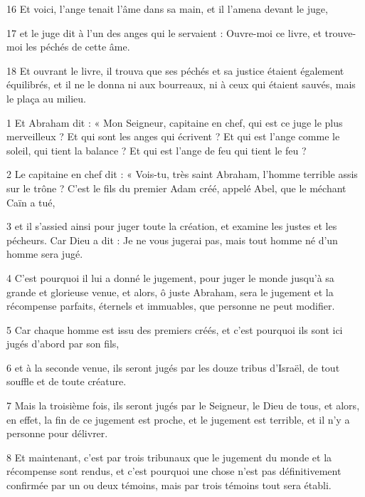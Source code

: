 \par 16 Et voici, l'ange tenait l'âme dans sa main, et il l'amena devant le juge,

\par 17 et le juge dit à l'un des anges qui le servaient : Ouvre-moi ce livre, et trouve-moi les péchés de cette âme.

\par 18 Et ouvrant le livre, il trouva que ses péchés et sa justice étaient également équilibrés, et il ne le donna ni aux bourreaux, ni à ceux qui étaient sauvés, mais le plaça au milieu.



\par 1 Et Abraham dit : « Mon Seigneur, capitaine en chef, qui est ce juge le plus merveilleux ? Et qui sont les anges qui écrivent ? Et qui est l’ange comme le soleil, qui tient la balance ? Et qui est l’ange de feu qui tient le feu ?

\par 2 Le capitaine en chef dit : « Vois-tu, très saint Abraham, l'homme terrible assis sur le trône ? C'est le fils du premier Adam créé, appelé Abel, que le méchant Caïn a tué,

\par 3 et il s'assied ainsi pour juger toute la création, et examine les justes et les pécheurs. Car Dieu a dit : Je ne vous jugerai pas, mais tout homme né d'un homme sera jugé.

\par 4 C'est pourquoi il lui a donné le jugement, pour juger le monde jusqu'à sa grande et glorieuse venue, et alors, ô juste Abraham, sera le jugement et la récompense parfaits, éternels et immuables, que personne ne peut modifier.

\par 5 Car chaque homme est issu des premiers créés, et c'est pourquoi ils sont ici jugés d'abord par son fils,

\par 6 et à la seconde venue, ils seront jugés par les douze tribus d'Israël, de tout souffle et de toute créature.

\par 7 Mais la troisième fois, ils seront jugés par le Seigneur, le Dieu de tous, et alors, en effet, la fin de ce jugement est proche, et le jugement est terrible, et il n'y a personne pour délivrer.

\par 8 Et maintenant, c'est par trois tribunaux que le jugement du monde et la récompense sont rendus, et c'est pourquoi une chose n'est pas définitivement confirmée par un ou deux témoins, mais par trois témoins tout sera établi.

